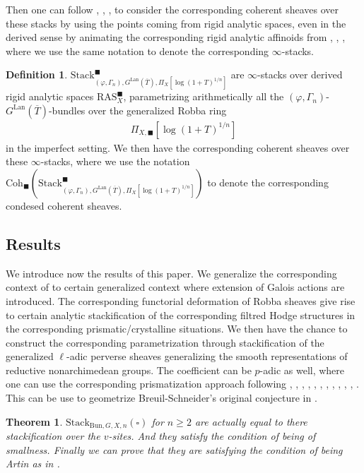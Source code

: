 \documentclass[12pt]{article}
\newtheorem{theorem}{Theorem}
\theoremstyle{definition}
\newtheorem{definition}{Definition}
\begin{document}
\indent Then one can follow \cite{FS}, \cite{DHKM}, \cite{EGH}, \cite{Z} to consider the corresponding coherent sheaves over these stacks by using the points coming from rigid analytic spaces, even in the derived sense by animating the corresponding rigid analytic affinoids from \cite{CSA}, \cite{CSB}, \cite{CSC}, where we use the same notation to denote the corresponding $\infty$-stacks.

\begin{definition}
$\mathrm{Stack}^\blacksquare_{(\varphi,\Gamma_n), G^\mathrm{Lan}(\overline{T}),\Pi_X[\log(1+T)^{1/n}]}$ are $\infty$-stacks over derived rigid analytic spaces $\mathrm{RAS}^\blacksquare_X$, parametrizing arithmetically all the $(\varphi,\Gamma_n)$-$G^\mathrm{Lan}(\overline{T})$-bundles over the generalized Robba ring 
\begin{align}
\Pi_{X,\blacksquare}[\log(1+T)^{1/n}]
\end{align}
in the imperfect setting. We then have the corresponding coherent sheaves over these $\infty$-stacks, where we use the notation $\mathrm{Coh}_\blacksquare(\mathrm{Stack}^\blacksquare_{(\varphi,\Gamma_n), G^\mathrm{Lan}(\overline{T}),\Pi_X[\log(1+T)^{1/n}]})$ to denote the corresponding condesed coherent sheaves.
\end{definition}

\subsection{Results}

\indent We introduce now the results of this paper. We generalize the corresponding context of \cite{FS} to certain generalized context where extension of Galois actions are introduced. The corresponding functorial deformation of Robba sheaves give rise to certain analytic stackification of the corresponding filtred Hodge structures in the corresponding prismatic/crystalline situations. We then have the chance to construct the corresponding parametrization through stackification of the generalized $\ell$-adic perverse sheaves generalizing the smooth representations of reductive nonarchimedean groups. The coefficient can be $p$-adic as well, where one can use the corresponding prismatization approach following \cite{CSA}, \cite{CSB}, \cite{CSC}, \cite{SchD}, \cite{SALBRC}, \cite{TA}, \cite{TB}, \cite{TC}, \cite{BBBK}, \cite{BS2}, \cite{BLA}, \cite{DC}. This can be use to geometrize Breuil-Schneider's original conjecture in \cite{BS}.

\begin{theorem}
$\mathrm{Stack}_{\mathrm{Bun},G,X,n}(\square)$ for $n\geq 2$ are actually equal to there stackification over the $v$-sites. And they satisfy the condition of being of smallness. Finally we can prove that they are satisfying the condition of being Artin as in \cite{FS}.
\end{theorem}
\end{document}
